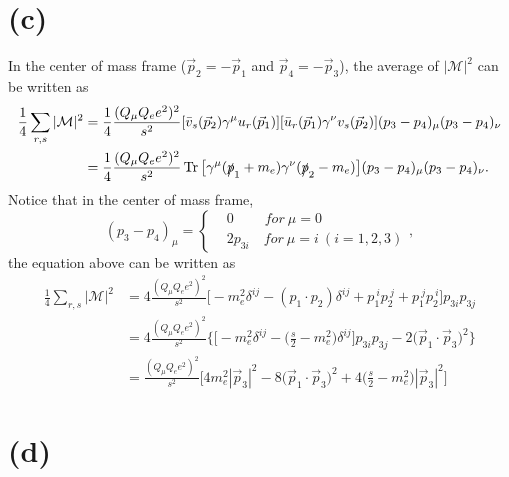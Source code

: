\documentclass[12pt]{article}
\begin{document}
\section*{(c)}

In the center of mass frame ($\vec{p}_2=-\vec{p}_1$ and $\vec{p}_4=-\vec{p}_3$), 
the average of $|\mathcal{M}|^2$ can be written as 
\begin{equation}
    \begin{split}
        \frac{1}{4}\sum_{r,s}|\mathcal{M}|^2&=\frac{1}{4}\frac{(Q_\mu Q_e e^2)^2}
        {s^2}[\bar{v}_s(\vec{p}_2)\gamma^\mu u_r(\vec{p}_1)][\bar{u}_r(\vec{p}_1)
        \gamma^\nu v_s(\vec{p}_2)](p_3-p_4)_\mu(p_3-p_4)_\nu\\
        &=\frac{1}{4}\frac{(Q_\mu Q_e e^2)^2}{s^2}\Tr\big[\gamma^\mu(\slashed{p}_1+m_e)
        \gamma^\nu(\slashed{p}_2-m_e)\big](p_3-p_4)_\mu(p_3-p_4)_\nu.
    \end{split}
\end{equation}
Notice that in the center of mass frame, 
\begin{equation*}
    (p_3-p_4)_\mu=\left\{\begin{aligned}
        &0 \qquad\  for\ \mu=0\\
        &2p_{3i}\quad for\ \mu=i\ (i=1,2,3)
    \end{aligned}
    \right.,
\end{equation*}
the equation above can be written as 
\begin{equation}
    \begin{split}
        \frac{1}{4}\sum_{r,s}|\mathcal{M}|^2&=4\frac{(Q_\mu Q_e e^2)^2}{s^2}
        \Big[-m_e^2\delta^{ij}-(p_1\cdot p_2)\delta^{ij}+p_1^{\ i}p_2^{\ j}+
        p_1^{\ j}p_2^{\ i}\Big]p_{3i}p_{3j}\\
        &=4\frac{(Q_\mu Q_e e^2)^2}{s^2}\bigg\{\Big[-m_e^2\delta^{ij}-\Big(\frac{s}{2}
        -m_e^2\Big)\delta^{ij}\Big]p_{3i}p_{3j}-2\big(\vec{p}_1\cdot\vec{p}_3\big)^2
        \bigg\}\\
        &=\frac{(Q_\mu Q_e e^2)^2}{s^2}\bigg[4m_e^2|\vec{p}_3|^2-
        8\big(\vec{p}_1\cdot\vec{p}_3\big)^2+4\Big(\frac{s}{2}-m_e^2\Big)
        |\vec{p}_3|^2\bigg]
    \end{split}
\end{equation} 

\section*{(d)}
\end{document}
